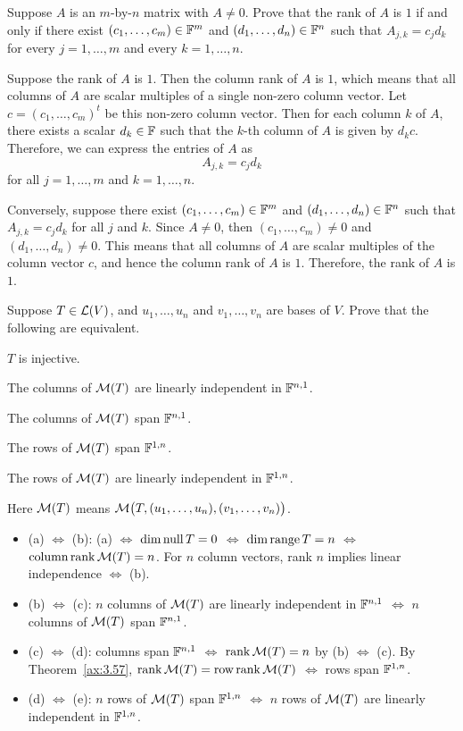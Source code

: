 \begin{exercise}
Suppose $A$ is an $m$-by-$n$ matrix with $A\ne0$. Prove that the rank of $A$
is $1$ if and only if there exist $(c_1,\dots,c_m)\in\mathbb{F}^m$ and
$(d_1,\dots,d_n)\in\mathbb{F}^n$ such that $A_{j,k}=c_jd_k$ for every $j=1,\dots,m$
and every $k=1,\dots,n$.
\end{exercise}
\begin{solution}
Suppose the rank of $A$ is $1$. Then the column rank of $A$ is $1$, which means
that all columns of $A$ are scalar multiples of a single non-zero column
vector. Let $c=(c_1,\dots,c_m)^t$ be this non-zero column vector. Then for each
column $k$ of $A$, there exists a scalar $d_k\in\mathbb{F}$ such that the $k$-th column
of $A$ is given by $d_kc$. Therefore, we can express the entries of $A$ as
\[ A_{j,k} = c_jd_k \]
for all $j=1,\dots,m$ and $k=1,\dots,n$.

Conversely, suppose there exist $(c_1,\dots,c_m)\in\mathbb{F}^m$ and
$(d_1,\dots,d_n)\in\mathbb{F}^n$ such that $A_{j,k}=c_jd_k$ for all $j$ and $k$. Since
$A\ne0$, then $(c_1,\dots,c_m)\ne0$ and $(d_1,\dots,d_n)\ne0$. This means that
all columns of $A$ are scalar multiples of the column vector $c$, and hence the
column rank of $A$ is $1$. Therefore, the rank of $A$ is $1$.
\end{solution}

\begin{exercise}
Suppose $T\in\mathcal{L}(V)$, and $u_1,\dots,u_n$ and $v_1,\dots,v_n$ are bases of
$V$. Prove that the following are equivalent.
\begin{parts}
\item $T$ is injective.
\item The columns of $\mathcal{M}(T)$ are linearly independent in $\mathbb{F}^{n,1}$.
\item The columns of $\mathcal{M}(T)$ span $\mathbb{F}^{n,1}$.
\item The rows of $\mathcal{M}(T)$ span $\mathbb{F}^{1,n}$.
\item The rows of $\mathcal{M}(T)$ are linearly independent in $\mathbb{F}^{1,n}$.
\end{parts}
Here $\mathcal{M}(T)$ means $\mathcal{M}\bigl(T,(u_1,\dots,u_n),(v_1,\dots,v_n)\bigr)$.
\end{exercise}
\begin{solution}\leavevmode
\begin{itemize}
\item (a) $\iff$ (b): (a) $\iff$ $\operatorname{dim}\operatorname{null} T=0$ $\iff$ $\operatorname{dim}\operatorname{range} T=n$
  $\iff$ $\operatorname{column\,rank}\mathcal{M}(T)=n$. For $n$ column vectors,
  rank $n$ implies linear independence $\iff$ (b).
\item (b) $\iff$ (c): $n$ columns of $\mathcal{M}(T)$ are linearly independent in
  $\mathbb{F}^{n,1}$ $\iff$ $n$ columns of $\mathcal{M}(T)$ span $\mathbb{F}^{n,1}$.
\item (c) $\iff$ (d): columns span $\mathbb{F}^{n,1}$ $\iff$ $\operatorname{rank}\mathcal{M}(T)=n$ by
  (b) $\iff$ (c). By Theorem~\ref{ax:3.57},
  $\operatorname{rank}\mathcal{M}(T)=\operatorname{row\,rank}\mathcal{M}(T)$ $\iff$ rows span $\mathbb{F}^{1,n}$.
\item (d) $\iff$ (e): $n$ rows of $\mathcal{M}(T)$ span $\mathbb{F}^{1,n}$ $\iff$ $n$ rows of
  $\mathcal{M}(T)$ are linearly independent in $\mathbb{F}^{1,n}$.
\end{itemize}
\end{solution}
